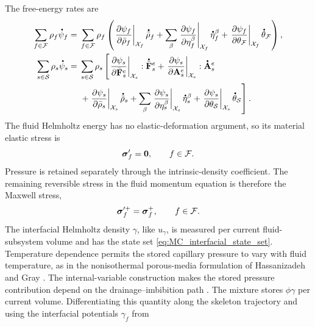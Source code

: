 The free-energy rates are
%
\begin{align}
	\sum_{f\in\mc F}\rho_f\phasedot\psi_f
	={} &
	\sum_{f\in\mc F}
	\rho_f
	\left(
	\left.
	\p{\psi_f}{\bar\rho_f}
	\right\vert_{\mc X_f}
	\phasedot{\bar\rho}_f
	+
	\sum_\beta
	\left.
	\p{\psi_f}{\eta_f^\beta}
	\right\vert_{\mc X_f}
	\phasedot\eta_f^\beta
	+
	\left.
	\p{\psi_f}{\theta_{\mc F}}
	\right\vert_{\mc X_f}
	\phasedot\theta_{\mc F}
	\right),
	\label{eq:MC_fluid_free_energy_rate}
	\\
	\sum_{s\in\mc S}\rho_s\phasedot\psi_s
	={} &
	\sum_{s\in\mc S}
	\rho_s
	\left[
		\left.
		\p{\psi_s}{\bar{\mbf F}_s^e}
		\right\vert_{\mc X_s}
		:
		\phasedot{\bar{\mbf F}}_s^e
		+
		\left.
		\p{\psi_s}{\mbf A_s^e}
		\right\vert_{\mc X_s}
		:
		\phasedot{\mbf A}_s^e
		\right.
	\notag       \\
	    & \left.
		+
		\left.
		\p{\psi_s}{\bar\rho_s}
		\right\vert_{\mc X_s}
		\phasedot{\bar\rho}_s
		+
		\sum_\beta
		\left.
		\p{\psi_s}{\eta_s^\beta}
		\right\vert_{\mc X_s}
		\phasedot\eta_s^\beta
		+
		\left.
		\p{\psi_s}{\theta_{\mc S}}
		\right\vert_{\mc X_s}
		\phasedot\theta_{\mc S}
		\right].
	\label{eq:MC_solid_free_energy_rate}
\end{align}
%
The fluid Helmholtz energy has no elastic-deformation argument, so its material
elastic stress is
%
\begin{equation}
	\boldsymbol{\sigma}_f'=\mathbf{0},
	\qquad
	f\in\mathcal{F} .
	\label{eq:MC_fluid_stress_free}
\end{equation}
%
Pressure is retained separately through the intrinsic-density coefficient.
The remaining reversible stress in the fluid momentum equation is therefore
the Maxwell stress,
%
\begin{equation}
	\boldsymbol{\sigma}_f^{\prime+}
	=
	\boldsymbol{\sigma}^{+}_{f},
	\qquad
	f\in\mathcal{F} .
	\label{eq:MC_fluid_total_reversible_stress}
\end{equation}
%
The interfacial Helmholtz density \(\gamma\), like \(u_\gamma\), is measured per
current fluid-subsystem volume and has the state set
\eqref{eq:MC_interfacial_state_set}.  Temperature
dependence permits the stored capillary pressure to vary with fluid temperature, as in
the nonisothermal porous-media formulation of Hassanizadeh and Gray
\cite{hassanizadeh1993thermodynamic}.  The internal-variable construction makes
the stored pressure contribution depend on the drainage--imbibition path
\cite{wei2006capillary_hysteresis}.  The mixture stores
\(\phi\gamma\) per current volume.  Differentiating this quantity along the
skeleton trajectory and using the interfacial potentials \(\gamma_f\) from
